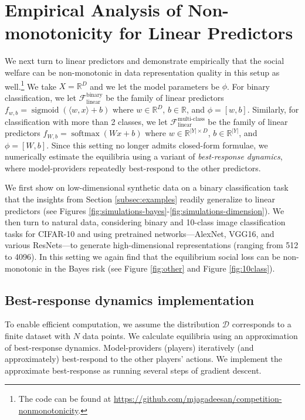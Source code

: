 \documentclass[letterpaper,11pt]{article}
\theoremstyle{plain}
\DeclareMathOperator*{\sigmoid}{sigmoid}
\DeclareMathOperator*{\softmax}{softmax}
\begin{document}
\section{Empirical Analysis of Non-monotonicity for Linear Predictors }\label{sec:linear}


We next turn to linear predictors and demonstrate empirically that the social welfare can be non-monotonic in data representation quality in this setup as well.\footnote{The code can be found at \url{https://github.com/mjagadeesan/competition-nonmonotonicity}.} We take $X = \mathbb{R}^D$ and we let the model parameters be $\phi$. For binary classification, we let $\mathcal{F}^{\text{binary}}_{\text{linear}}$ be the family of linear predictors $f_{w,b} = \sigmoid(\langle w, x\rangle +b)$ where $w \in \mathbb{R}^D$, $b \in \mathbb{R}$, and $\phi = [w, b]$. Similarly, for classification with more than 2 classes, we let $\mathcal{F}^{\text{multi-class}}_{\text{linear}}$ be the family of linear predictors $f_{W,b} = \softmax(Wx + b)$ where $w \in \mathbb{R}^{ |Y| \times D}$, $b \in \mathbb{R}^{|Y|}$, and $\phi = [W, b]$.  Since this setting no longer admits closed-form formulae, we numerically estimate the equilibria using a variant of \textit{best-response dynamics}, where model-providers repeatedly best-respond to the other predictors. 

We first show on low-dimensional synthetic data on a binary classification task that the insights from Section \ref{subsec:examples} readily generalize to linear predictors (see Figures \ref{fig:simulations-bayes}-\ref{fig:simulations-dimension}). We then turn to natural data, considering binary and 10-class image classification tasks for CIFAR-10 and using pretrained networks---AlexNet, VGG16, and various ResNets---to generate high-dimensional representations (ranging from 512 to 4096). In this setting we again find that the equilibrium social loss can be non-monotonic in the Bayes risk (see Figure \ref{fig:other} and Figure \ref{fig:10class}). 


\subsection{Best-response dynamics implementation}
\label{subsec:bestresponsedynamics}

To enable efficient computation, we assume the distribution $\mathcal{D}$ corresponds to a finite dataset with $N$ data points. We calculate equilibria using an approximation of best-response dynamics. Model-providers (players) iteratively (and approximately) best-respond to the other players' actions. We implement the approximate best-response as running several steps of gradient descent.  
\end{document}
